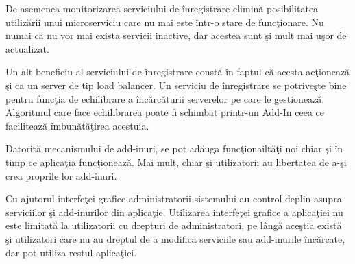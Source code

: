 \documentclass[a4paper,12pt]{report}
\begin{document}
De asemenea monitorizarea serviciului de \^inregistrare elimin\u a posibilitatea 
utiliz\u arii unui microserviciu care nu mai este \^intr-o stare de func\c tionare.
Nu numai c\u a nu vor mai exista servicii inactive, dar acestea sunt  \c si mult mai 
u\c sor de actualizat. 

Un alt beneficiu al serviciului de \^inregistrare const\u a \^in faptul c\u a acesta
ac\c tioneaz\u a \c si ca un server de tip load balancer.
Un serviciu de \^inregistrare se potrive\c ste bine pentru func\c tia de echilibrare a \^inc\u arc\u aturii
serverelor pe care le gestioneaz\u a. Algoritmul care face echilibrarea poate fi 
schimbat printr-un Add-In ceea ce faciliteaz\u a \^imbun\u at\u a\c tirea acestuia.

Datorit\u a mecanismului de add-inuri, se pot ad\u auga func\c tionailt\u a\c ti noi
chiar \c si \^in timp ce aplica\c tia func\c tioneaz\u a. Mai mult,
chiar \c si utilizatorii au libertatea de a-\c si crea proprile lor add-inuri. 

Cu ajutorul interfe\c tei grafice administratorii sistemului au control deplin 
asupra serviciilor \c si add-inurilor din aplica\c tie. Utilizarea interfe\c tei grafice 
a aplica\c tiei nu este limitat\u a la utilizatorii cu drepturi de administratori, 
pe l\^ang\u a ace\c stia exist\u a \c si utilizatori care nu au dreptul de a modifica serviciile 
sau add-inurile \^inc\u arcate, dar pot utiliza restul aplica\c tiei.


\printbibliography
\end{document}
